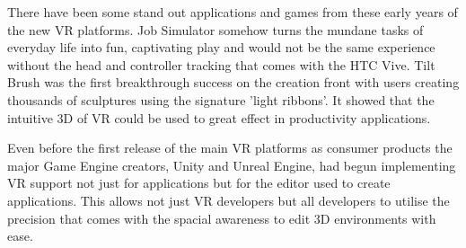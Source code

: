 \documentclass[12pt]{article}
\begin{document}
There have been some stand out applications and games from these early years of the new VR platforms. Job Simulator somehow turns the mundane tasks of everyday life into fun, captivating play and would not be the same experience without the head and controller tracking that comes with the HTC Vive. Tilt Brush was the first breakthrough success on the creation front with users creating thousands of sculptures using the signature 'light ribbons'. It showed that the intuitive 3D of VR could be used to great effect in productivity applications.

Even before the first release of the main VR platforms as consumer products the major Game Engine creators, Unity and Unreal Engine, had begun implementing VR support not just for applications but for the editor used to create applications. This allows not just VR developers but all developers to utilise the precision that comes with the spacial awareness to edit 3D environments with ease.
\end{document}
